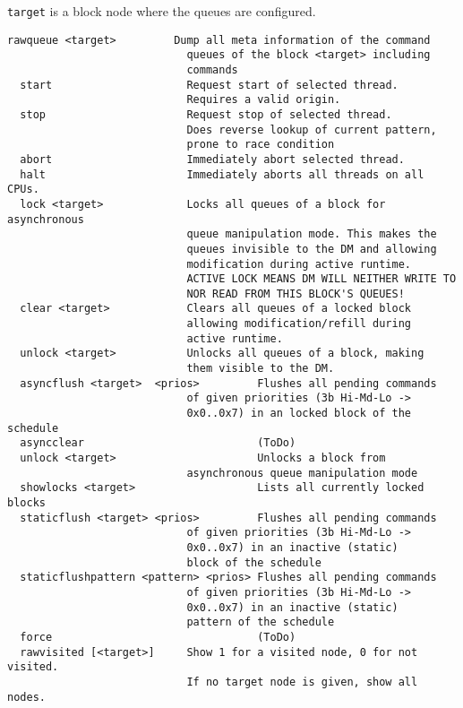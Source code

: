 \texttt{target} is a block node where the queues are configured.
\begin{lstlisting}[style = helptext]
  rawqueue <target>         Dump all meta information of the command 
                            queues of the block <target> including 
                            commands
  start                     Request start of selected thread. 
                            Requires a valid origin.
  stop                      Request stop of selected thread. 
                            Does reverse lookup of current pattern, 
                            prone to race condition
  abort                     Immediately abort selected thread.
  halt                      Immediately aborts all threads on all CPUs.
  lock <target>             Locks all queues of a block for asynchronous
                            queue manipulation mode. This makes the
                            queues invisible to the DM and allowing 
                            modification during active runtime. 
                            ACTIVE LOCK MEANS DM WILL NEITHER WRITE TO 
                            NOR READ FROM THIS BLOCK'S QUEUES!
  clear <target>            Clears all queues of a locked block 
                            allowing modification/refill during 
                            active runtime.
  unlock <target>           Unlocks all queues of a block, making 
                            them visible to the DM.
  asyncflush <target>  <prios>         Flushes all pending commands 
                            of given priorities (3b Hi-Md-Lo -> 
                            0x0..0x7) in an locked block of the schedule
  asyncclear                           (ToDo)
  unlock <target>                      Unlocks a block from 
                            asynchronous queue manipulation mode
  showlocks <target>                   Lists all currently locked blocks
  staticflush <target> <prios>         Flushes all pending commands 
                            of given priorities (3b Hi-Md-Lo -> 
                            0x0..0x7) in an inactive (static) 
                            block of the schedule
  staticflushpattern <pattern> <prios> Flushes all pending commands 
                            of given priorities (3b Hi-Md-Lo -> 
                            0x0..0x7) in an inactive (static) 
                            pattern of the schedule
  force                                (ToDo)
  rawvisited [<target>]     Show 1 for a visited node, 0 for not visited.
                            If no target node is given, show all nodes.


\end{lstlisting}
